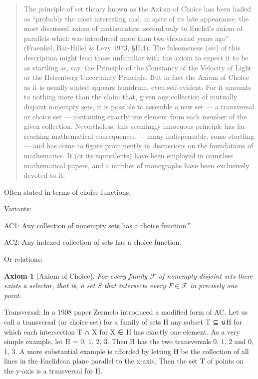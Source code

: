 \documentclass[reqno,12pt]{tufte-book}
\numberwithin{equation}{subsection}
\newtheorem{axiom}{Axiom}
\begin{document}
\blockquote{The principle of set theory known as the Axiom of Choice has been hailed as “probably the most interesting and, in spite of its late appearance, the most discussed axiom of mathematics, second only to Euclid's axiom of parallels which was introduced more than two thousand years ago” (Fraenkel, Bar-Hillel \& Levy 1973, §II.4).  The fulsomeness (\textit{sic}) of this description might lead those unfamiliar with the axiom to expect it to be as startling as, say, the Principle of the Constancy of the Velocity of Light or the Heisenberg Uncertainty Principle. But in fact the Axiom of Choice as it is usually stated appears humdrum, even self-evident. For it amounts to nothing more than the claim that, given any collection of mutually disjoint nonempty sets, it is possible to assemble a new set — a transversal or choice set — containing exactly one element from each member of the given collection. Nevertheless, this seemingly innocuous principle has far-reaching mathematical consequences — many indispensable, some startling — and has come to figure prominently in discussions on the foundations of mathematics. It (or its equivalents) have been employed in countless mathematical papers, and a number of monographs have been exclusively devoted to it.\cite{bell_axiom_2013}}

Often stated in terms of choice functions.

Variants:

AC1: 
Any collection of nonempty sets has a choice function.''

AC2: 
Any indexed collection of sets has a choice function.

Or relations:

\begin{axiom}[Axiom of Choice]
\label{ax:choice}
For every family $\mathcal{F}$ of nonempty disjoint sets there exists
a \textit{selector}, that is, a set $S$ that intersects every $F\in
\mathcal{F}$ in precisely one point.\cite{ciesielski_set_1997}
\end{axiom}

Transversal:  In a 1908 paper Zermelo introduced a modified form of AC. Let us call a transversal (or choice set) for a family of sets H any subset T ⊆ ∪H for which each intersection T ∩ X for X ∈ H has exactly one element.  As a very simple example, let H = {{0}, {1}, {2, 3}}. Then H has the two transversals {0, 1, 2} and {0, 1, 3}. A more substantial example is afforded by letting H be the collection of all lines in the Euclidean plane parallel to the x-axis. Then the set T of points on the y-axis is a transversal for H.
\end{document}
